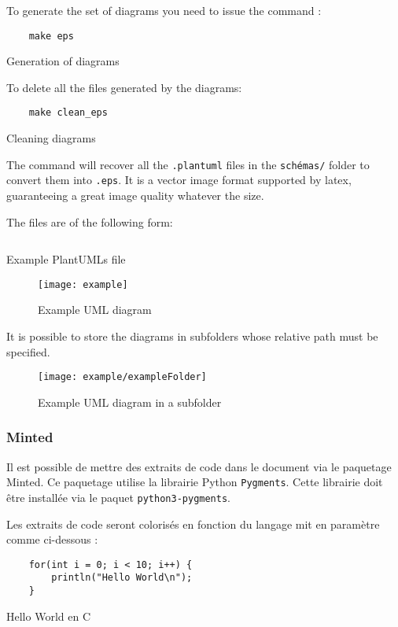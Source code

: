 To generate the set of diagrams you need to issue the command :
\begin{code}
    \begin{verbatim}
    make eps
\end{verbatim}
    \caption{Generation of diagrams}
\end{code}

To delete all the files generated by the diagrams:
\begin{code}
    \begin{verbatim}
    make clean_eps
\end{verbatim}
    \caption{Cleaning diagrams}
\end{code}

The command will recover all the \verb=.plantuml= files
in the \verb=schémas/= folder to convert them into \verb=.eps=.
It is a vector image format supported by \gls{latex},
guaranteeing a great image quality whatever the size.

The files are of the following form:
\begin{code}
    \inputminted{vim}{../schemas/example.plantuml}
    \caption{Example PlantUMLs file}
\end{code}

\begin{figure}[H]
    \centering
    \texttt{[image: example]}
    \caption{Example UML diagram}
\end{figure}

It is possible to store the diagrams in subfolders whose relative path must be specified.
\begin{figure}[H]
    \centering
    \texttt{[image: example/exampleFolder]}
    \caption{Example UML diagram in a subfolder}
\end{figure}

\subsubsection{Minted}
Il est possible de mettre des extraits de code dans le document via le paquetage Minted.
Ce paquetage utilise la librairie Python \verb=Pygments=.
Cette librairie doit être installée via le paquet \verb=python3-pygments=.

Les extraits de code seront colorisés en fonction du langage mit en paramètre comme ci-dessous :

\begin{code}
    \begin{verbatim}
    for(int i = 0; i < 10; i++) {
        println("Hello World\n");
    }
\end{verbatim}
    \caption{Hello World en C}
\end{code}

